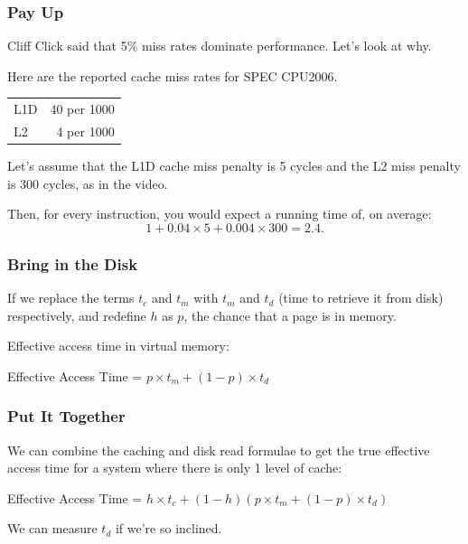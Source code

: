 \begin{frame}
\frametitle{Pay Up}

Cliff Click said that 5\% miss rates dominate performance. Let's look at why.

Here are the reported cache miss rates for SPEC CPU2006.

\begin{center}
\begin{tabular}{lr}
L1D & 40 per 1000 \\
L2 & 4 per 1000
\end{tabular}
\end{center}

Let's assume that the L1D cache miss penalty is 5 cycles and the L2 miss penalty is
300 cycles, as in the video. 

Then, for every instruction, you would expect a running
time of, on average:
\[ 1 + 0.04 \times 5 + 0.004 \times 300 = 2.4. \]

\end{frame}



\begin{frame}
\frametitle{Bring in the Disk}

If we replace the terms $t_{c}$ and $t_{m}$ with $t_{m}$ and $t_{d}$ (time to retrieve it from disk) respectively, and redefine $h$ as $p$, the chance that a page is in memory.

Effective access time in virtual memory: 

\begin{center}
	Effective Access Time = $ p \times t_{m} + (1 - p) \times t_{d}$
\end{center}


\end{frame}



\begin{frame}
\frametitle{Put It Together}

We can combine the caching and disk read formulae to get the true effective access time for a system where there is only 1 level of cache:

\begin{center}
	Effective Access Time = $ h \times t_{c} + (1 - h) ( p \times t_{m} + (1 - p) \times t_{d})$
\end{center}

We can measure $t_{d}$ if we're so inclined.

\end{frame}


